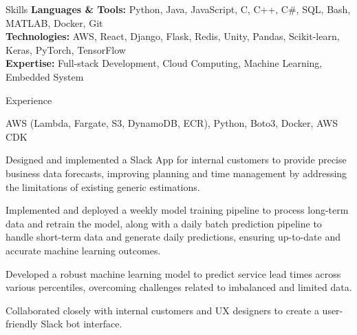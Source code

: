 \documentclass[a4paper,10pt]{extarticle}
\begin{document}
\pagestyle{empty}


\begin{customsection}{Skills}
    \textbf{Languages \& Tools:} Python, Java, JavaScript, C, C++, C\#, SQL, Bash, MATLAB, Docker, Git\\ 
    \textbf{Technologies:} AWS, React, Django, Flask, Redis, Unity, Pandas, Scikit-learn, Keras, PyTorch, TensorFlow \\ 
    \textbf{Expertise:} Full-stack Development, Cloud Computing, Machine Learning, Embedded System
\end{customsection}

\begin{customsection}{Experience}

    {AWS (Lambda, Fargate, S3, DynamoDB, ECR), Python, Boto3, Docker, AWS CDK}
    {
        \item Designed and implemented a Slack App for internal customers to provide precise business data forecasts, improving planning and time management by addressing the limitations of existing generic estimations.
        \item Implemented and deployed a weekly model training pipeline to process long-term data and retrain the model, along with a daily batch prediction pipeline to handle short-term data and generate daily predictions, ensuring up-to-date and accurate machine learning outcomes.
        \item Developed a robust machine learning model to predict service lead times across various percentiles, overcoming challenges related to imbalanced and limited data. 
        \item Collaborated closely with internal customers and UX designers to create a user-friendly Slack bot interface. 
    }
    
\end{customsection}
\end{document}
